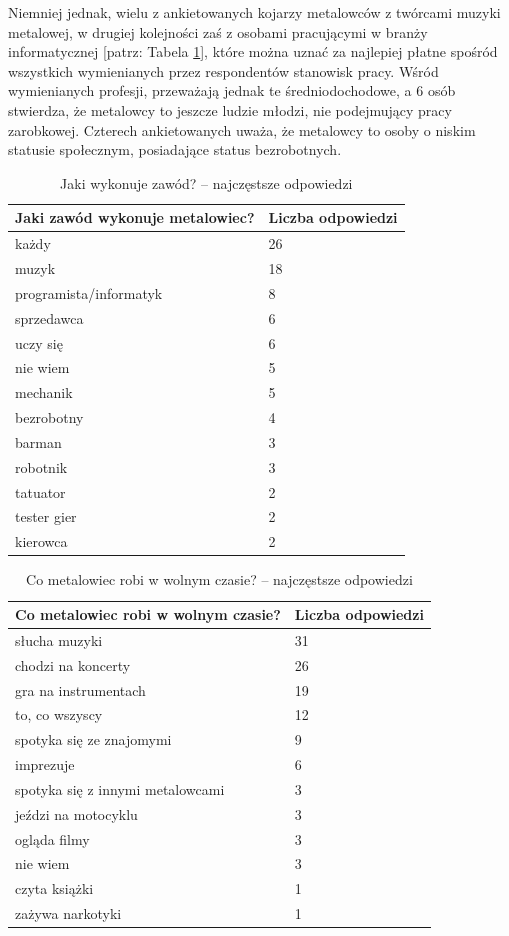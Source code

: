 \documentclass[12pt, a4paper, titlepage]{report}
\begin{document}
Niemniej jednak, wielu z ankietowanych kojarzy metalowców z twórcami muzyki metalowej, w drugiej kolejności zaś z osobami pracującymi w branży informatycznej [patrz: Tabela \ref{table:3}], które można uznać za najlepiej płatne spośród wszystkich wymienianych przez respondentów stanowisk pracy. Wśród wymienianych profesji, przeważają jednak te średniodochodowe, a 6 osób stwierdza, że metalowcy to jeszcze ludzie młodzi, nie podejmujący pracy zarobkowej. Czterech ankietowanych uważa, że metalowcy to osoby o niskim statusie społecznym, posiadające status bezrobotnych.  


\begin{table}[!tp]
\begin{tabular}{ m{23em} | m{5em} } 
\textbf{Jaki zawód wykonuje metalowiec?} & Liczba odpowiedzi \\
\hline
każdy & 26 \\
muzyk & 18 \\
programista/informatyk & 8 \\
sprzedawca & 6 \\
uczy się & 6 \\
nie wiem & 5 \\
mechanik & 5 \\
bezrobotny & 4 \\
barman & 3 \\
robotnik & 3 \\
tatuator & 2 \\
tester gier & 2 \\
kierowca & 2 \\
\end{tabular} 
\caption{Jaki wykonuje zawód? -- najczęstsze odpowiedzi}
\label{table:3}
\end{table}
\newpage
\begin{table}[!htb]
\begin{tabular}{ m{23em} | m{5em} } 
\textbf{Co metalowiec robi w wolnym czasie?
} & Liczba odpowiedzi \\
\hline
słucha muzyki & 31 \\
chodzi na koncerty & 26 \\
gra na instrumentach & 19 \\
to, co wszyscy & 12 \\
spotyka się ze znajomymi & 9 \\
imprezuje & 6 \\
spotyka się z innymi metalowcami & 3 \\
jeździ na motocyklu & 3 \\
ogląda filmy & 3 \\
nie wiem & 3 \\
czyta książki & 1 \\
zażywa narkotyki & 1 \\
\end{tabular} 
\caption{Co metalowiec robi w wolnym czasie? -- najczęstsze odpowiedzi}
\label{table:4}
\end{table}
\end{document}
